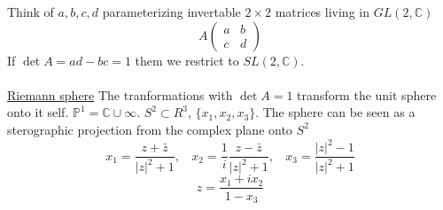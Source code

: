 \documentclass[a4paper,12pt]{article}
\begin{document}
Think of $a,b,c,d$ parameterizing invertable $2\times 2$ matrices living in $GL(2,\mathds{C})$
\begin{equation}
A\begin{pmatrix}
a & b \\c& d
\end{pmatrix}
\end{equation}
If $\det A=ad-bc=1$ them we restrict to $SL(2,\mathds{C})$. \\\\
\underline{Riemann sphere}
The tranformations with $\det A=1$ transform the unit sphere onto it self. $\mathds{P}^1=\mathds{C}\cup \infty$. $S^2\subset R^3$, $\{x_1,x_2,x_3\}$. The sphere can be seen as a sterographic projection from the complex plane onto $S^2$
\begin{equation}
x_1=\frac{z+\bar z}{|z|^2+1},~~~~x_2=\frac{1}{i}\frac{z-\bar z}{|z|^2+1},~~~~x_3=\frac{|z|^2-1}{|z|^2+1}
\end{equation}
\begin{equation}
z=\frac{x_1+ix_2}{1-x_3}
\end{equation}\\\\
\end{document}
